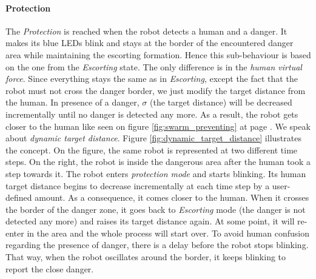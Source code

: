 \documentclass[oneside, a4paper, 12pt]{memoir}
\begin{document}
		
			\paragraph{Protection}
			
			The \emph{Protection} is reached when the robot detects a human and a danger. It makes its blue LEDs blink and stays at the border of the encountered danger area while maintaining the escorting formation. Hence this sub-behaviour is based on the one from the \emph{Escorting} state. The only difference is in the \emph{human virtual force}. Since everything stays the same as in \emph{Escorting}, except the fact that the robot must not cross the danger border, we just modify the target distance from the human. In presence of a danger, $\sigma$ (the target distance) will be decreased incrementally until no danger is detected any more. As a result, the robot gets closer to the human like seen on figure \ref{fig:swarm_preventing} at page \pageref{fig:swarm_preventing}. We speak about \emph{dynamic target distance}. Figure \ref{fig:dynamic_target_distance} illustrates the concept. On the figure, the same robot is represented at two different time steps. On the right, the robot is inside the dangerous area after the human took a step towards it. The robot enters \emph{protection mode} and starts blinking. Its human target distance begins to decrease incrementally at each time step by a user-defined amount. As a consequence, it comes closer to the human. When it crosses the border of the danger zone, it goes back to \emph{Escorting} mode (the danger is not detected any more) and raises its target distance again. At some point, it will re-enter in the area and the whole process will start over. To avoid human confusion regarding the presence of danger, there is a delay before the robot stops blinking. That way, when the robot oscillates around the border, it keeps blinking to report the close danger.
			
\end{document}
